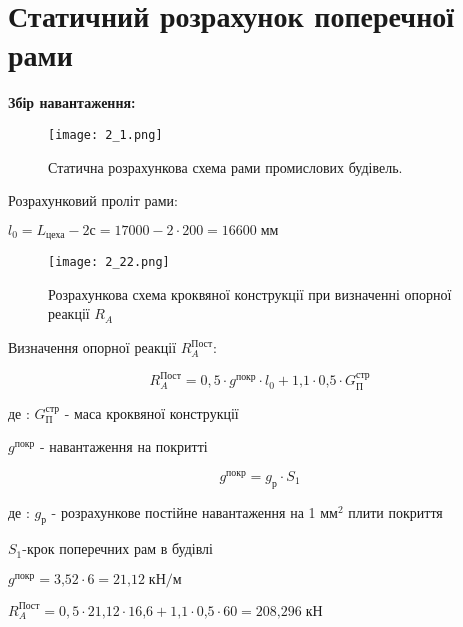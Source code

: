\documentclass[a4paper,14pt]{article}
\begin{document}
\section{Статичний розрахунок поперечної рами}

\textbf{Збір навантаження:}
\begin{figure}[h]
    \begin{center}
        \texttt{[image: 2\_1.png]}
        \caption{Статична розрахункова схема рами промислових будівель.}\label{ris2_1} 
    \end{center}
\end{figure}

Розрахунковий проліт рами:

$l_0=L_{\textit{цеха}}-2с=17000-2\cdot 200=16600\;{\textit{мм}}$
\begin{figure}[h!]
    \begin{center}
        \texttt{[image: 2\_22.png]}
        \caption{Розрахункова схема кроквяної конструкції при визначенні
        опорної реакції $R_A$}\label{ris2_22} 
    \end{center}
\end{figure}

Визначення опорної реакції $R^{\textit{Пост}}_A$:

\begin{equation}
    R^{\textit{Пост}}_A=0,5\cdot g^{\textit{покр}}\cdot l_0 + {\textit{1,1}}\cdot {\textit{0,5}}\cdot G^{\textit{стр}}_{\textit{П}}
\end{equation}

де : $G^{\textit{стр}}_{\textit{П}}$ - маса кроквяної конструкції

$g^{\textit{покр}}$ - навантаження на покритті

 
\begin{equation}
    g^{\textit{покр}}=g_{\textit{р}}\cdot S_1
\end{equation}

де : $g_{\textit{р}}$ - розрахункове постійне навантаження на 1 м$м^{\textit{2}}$ плити покриття

$S_1$-крок поперечних рам в будівлі

$g^{\textit{покр}}={\textit{3,52}}\cdot 6 = {\textit{21,12}}\;\textit{кН/м}$

$R^{\textit{Пост}}_A=0,5\cdot {\textit{21,12}}\cdot {\textit{16,6}}+ {\textit{1,1}}\cdot {\textit{0,5}}\cdot 60={\textit{208,296}}\;{\textit{кН}}$
\end{document}
